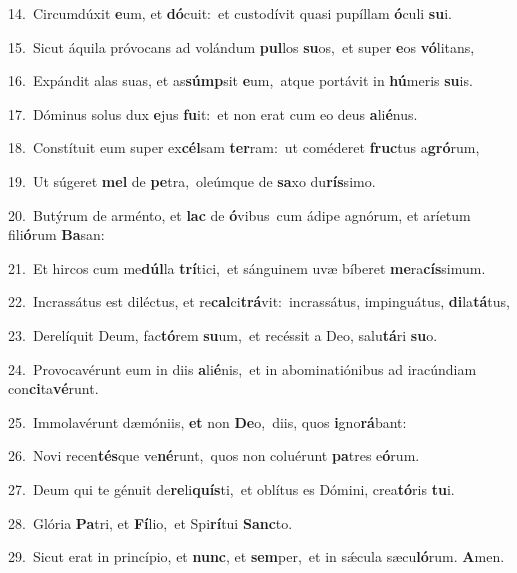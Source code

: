 {\numbfont\textcolor{\numbcolor}{14.}}~Circumdúxit \textbf{e}\-um, et \textbf{dó}\-cuit:~\star et custodívit quasi pupíllam \textbf{ó}\-culi \textbf{su}\-i.\par
{\numbfont\textcolor{\numbcolor}{15.}}~Sicut áquila próvocans ad volándum \textbf{pul}\-los \textbf{su}\-os,~\star et super \textbf{e}\-os \textbf{vó}\-litans,\par
{\numbfont\textcolor{\numbcolor}{16.}}~Expándit alas suas, et as\-\textbf{súmp}\-sit \textbf{e}\-um,~\star atque portávit in \textbf{hú}\-meris \textbf{su}\-is.\par
{\numbfont\textcolor{\numbcolor}{17.}}~Dóminus solus dux \textbf{e}\-jus \textbf{fu}\-it:~\star et non erat cum eo deus \textbf{a}\-li\-\textbf{é}\-nus.\par
{\numbfont\textcolor{\numbcolor}{18.}}~Constítuit eum super ex\-\textbf{cél}\-sam \textbf{ter}\-ram:~\star ut coméderet \textbf{fruc}\-tus a\-\textbf{gró}\-rum,\par
{\numbfont\textcolor{\numbcolor}{19.}}~Ut súgeret \textbf{mel} de \textbf{pe}\-tra,~\star oleúmque de \textbf{sa}\-xo du\-\textbf{rís}\-simo.\par
{\numbfont\textcolor{\numbcolor}{20.}}~Butýrum de arménto, et \textbf{lac} de \textbf{ó}\-vibus~\star cum ádipe agnórum, et aríetum fili\-\textbf{ó}\-rum \textbf{Ba}\-san:\par
{\numbfont\textcolor{\numbcolor}{21.}}~Et hircos cum me\-\textbf{dúl}\-la \textbf{trí}\-tici,~\star et sánguinem uvæ bíberet \textbf{me}\-ra\-\textbf{cís}\-simum.\par
{\numbfont\textcolor{\numbcolor}{22.}}~Incrassátus est diléctus, et re\-\textbf{cal}\-ci\-\textbf{trá}\-vit:~\star incrassátus, impinguátus, \textbf{di}\-la\-\textbf{tá}\-tus,\par
{\numbfont\textcolor{\numbcolor}{23.}}~Derelíquit Deum, fac\-\textbf{tó}\-rem \textbf{su}\-um,~\star et recéssit a Deo, salu\-\textbf{tá}\-ri \textbf{su}\-o.\par
{\numbfont\textcolor{\numbcolor}{24.}}~Provocavérunt eum in diis \textbf{a}\-li\-\textbf{é}\-nis,~\star et in abominatiónibus ad iracúndiam con\-\textbf{ci}\-ta\-\textbf{vé}\-runt.\par
{\numbfont\textcolor{\numbcolor}{25.}}~Immolavérunt dæmóniis, \textbf{et} non \textbf{De}\-o,~\star diis, quos \textbf{i}\-gno\-\textbf{rá}\-bant:\par
{\numbfont\textcolor{\numbcolor}{26.}}~Novi recen\-\textbf{tés}\-que ve\-\textbf{né}\-runt,~\star quos non coluérunt \textbf{pa}\-tres e\-\textbf{ó}\-rum.\par
{\numbfont\textcolor{\numbcolor}{27.}}~Deum qui te génuit de\-\textbf{re}\-li\-\textbf{quís}\-ti,~\star et oblítus es Dómini, crea\-\textbf{tó}\-ris \textbf{tu}\-i.\par
{\numbfont\textcolor{\numbcolor}{28.}}~Glória \textbf{Pa}\-tri, et \textbf{Fí}\-lio,~\star et Spi\-\textbf{rí}\-tui \textbf{Sanc}\-to.\par
{\numbfont\textcolor{\numbcolor}{29.}}~Sicut erat in princípio, et \textbf{nunc}\-, et \textbf{sem}\-per,~\star et in sǽcula sæcu\-\textbf{ló}\-rum. \textbf{A}\-men.\par
